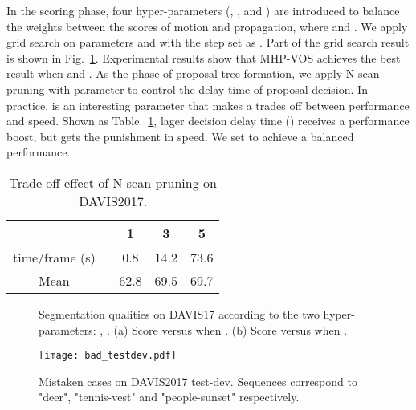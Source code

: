\documentclass[10pt,twocolumn,letterpaper]{article}
\begin{document}
In the scoring phase, four hyper-parameters (, ,  and ) are introduced to balance the weights between the scores of motion and propagation, where  and . We apply grid search on parameters  and  with the step set as . Part of the grid search result is shown in Fig.~\ref{Fig.hyper_parameters}. Experimental results show that MHP-VOS achieves the best result when  and . As the phase of proposal tree formation, we apply N-scan pruning with parameter  to control the delay time of proposal decision. In practice,  is an interesting parameter that makes a trades off between performance and speed. Shown as Table.~\ref{tab:n_purning}, lager decision delay time () receives a performance boost, but gets the punishment in speed. We set  to achieve a balanced performance.

\begin{table}[H]
\vspace{-5pt}
\small
\centering
\begin{tabular}{c|ccc}
\hline
 \ & 1 & 3 & 5 \\ \hline 
time/frame (s) \ & 0.8 & 14.2  & 73.6 \\
Mean  \ & 62.8 & 69.5 & 69.7 \\ \hline 
\end{tabular}
\vspace{3pt}
\caption{Trade-off effect of N-scan pruning on DAVIS2017.}
\label{tab:n_purning}
\vspace{-10pt}
\end{table}




\begin{figure}[t]
\vspace{-14pt}
\centering 
{}
\vspace{-6pt}
\caption{Segmentation qualities on DAVIS17 according to the two hyper-parameters: , . (a) Score versus  when . (b) Score versus  when .}
\vspace{-14pt}
\label{Fig.hyper_parameters}
\end{figure}

\begin{figure}[b]
\vspace{-10pt}
\centering
\texttt{[image: bad\_testdev.pdf]}
\vspace{-12pt}
\caption{Mistaken cases on  DAVIS2017 test-dev. Sequences correspond to "deer", "tennis-vest" and "people-sunset" respectively.} 
\label{fig:bad_testdev}
\vspace{-10pt}
\end{figure}
\end{document}
